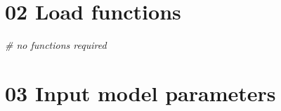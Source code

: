 \documentclass[
]{article}
\newenvironment{Shaded}{\begin{snugshade}}{\end{snugshade}}
\newcommand{\CommentTok}[1]{\textcolor[rgb]{0.56,0.35,0.01}{\textit{#1}}}
\begin{document}
\hypertarget{load-functions}{%
\section{02 Load functions}\label{load-functions}}

\begin{Shaded}
\begin{Highlighting}[]
\CommentTok{# no functions required}
\end{Highlighting}
\end{Shaded}

\hypertarget{input-model-parameters}{%
\section{03 Input model parameters}\label{input-model-parameters}}
\end{document}
